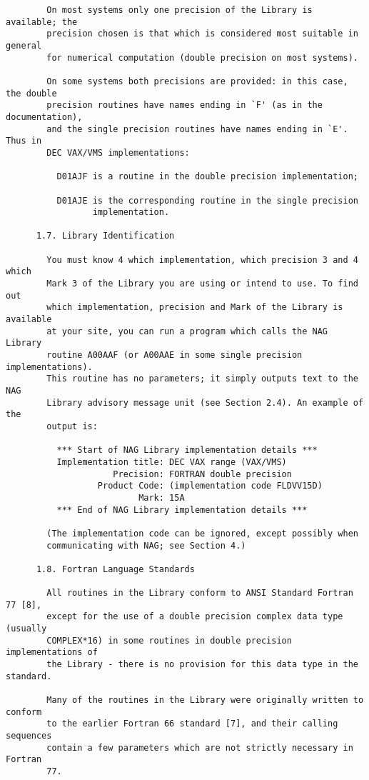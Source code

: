 \begin{small}
\begin{verbatim}
        On most systems only one precision of the Library is available; the
        precision chosen is that which is considered most suitable in general
        for numerical computation (double precision on most systems).

        On some systems both precisions are provided: in this case, the double
        precision routines have names ending in `F' (as in the documentation),
        and the single precision routines have names ending in `E'. Thus in
        DEC VAX/VMS implementations:

          D01AJF is a routine in the double precision implementation;

          D01AJE is the corresponding routine in the single precision
                 implementation.

      1.7. Library Identification

        You must know 4 which implementation, which precision 3 and 4 which
        Mark 3 of the Library you are using or intend to use. To find out
        which implementation, precision and Mark of the Library is available
        at your site, you can run a program which calls the NAG Library
        routine A00AAF (or A00AAE in some single precision implementations).
        This routine has no parameters; it simply outputs text to the NAG
        Library advisory message unit (see Section 2.4). An example of the
        output is:

          *** Start of NAG Library implementation details ***
          Implementation title: DEC VAX range (VAX/VMS)
                     Precision: FORTRAN double precision
                  Product Code: (implementation code FLDVV15D)
                          Mark: 15A
          *** End of NAG Library implementation details ***

        (The implementation code can be ignored, except possibly when
        communicating with NAG; see Section 4.)

      1.8. Fortran Language Standards

        All routines in the Library conform to ANSI Standard Fortran 77 [8],
        except for the use of a double precision complex data type (usually
        COMPLEX*16) in some routines in double precision implementations of
        the Library - there is no provision for this data type in the standard.

        Many of the routines in the Library were originally written to conform
        to the earlier Fortran 66 standard [7], and their calling sequences
        contain a few parameters which are not strictly necessary in Fortran
        77.



\end{verbatim}
\end{small}
